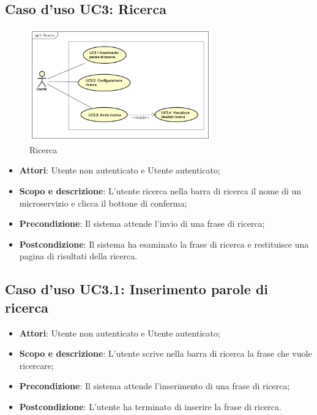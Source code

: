 \documentclass[12pt,a4paper,titlepage]{article}
\begin{document}
	\subsection{Caso d'uso UC3: Ricerca}
	\label{UC3}
	\begin{figure}[H]
		\centering
		\includegraphics[width=0.7\textwidth]{UseCase/Ricerca}
		\caption{Ricerca}
	\end{figure}
	\begin{itemize}
		\item \textbf{Attori}: Utente non autenticato e Utente autenticato;
		\item \textbf{Scopo e descrizione}: L'utente ricerca nella barra di ricerca il nome di un microservizio e clicca il bottone di conferma;
		\item \textbf{Precondizione}: Il sistema attende l'invio di una frase di ricerca;
		\item \textbf{Postcondizione}: Il sistema ha esaminato la frase di ricerca e restituisce una pagina di risultati della ricerca.
	\end{itemize}

	\subsection{Caso d'uso UC3.1: Inserimento parole di ricerca}
	\label{UC3.1}
	\begin{itemize}
		\item \textbf{Attori}: Utente non autenticato e Utente autenticato;
		\item \textbf{Scopo e descrizione}: L'utente scrive nella barra di ricerca la frase che vuole ricercare;
		\item \textbf{Precondizione}: Il sistema attende l'inserimento di una frase di ricerca;
		\item \textbf{Postcondizione}: L'utente ha terminato di inserire la frase di ricerca.
	\end{itemize}
\end{document}
